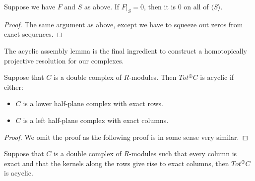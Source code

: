 \documentclass[../thesis.tex]{subfiles}
\begin{document}
            \begin{lemma}
                Suppose we have $F$ and $S$ as above. If $F|_S = 0$, then it is $0$ on all of $\langle S \rangle$.
            \end{lemma}

            \begin{proof}
                The same argument as above, except we have to squeeze out zeros from exact sequences.
            \end{proof}

            The acyclic assembly lemma is the final ingredient to construct a homotopically projective resolution for our complexes.

            \begin{lemma}
                Suppose that $C$ is a double complex of $R$-modules. Then $Tot^\oplus C$ is acyclic if either:
                \begin{itemize}
                    \item $C$ is a lower half-plane complex with exact rows.
                    \item $C$ is a left half-plane complex with exact columns.
                \end{itemize}
            \end{lemma}

            \begin{proof}
                We omit the proof as the following proof is in some sense very similar.
            \end{proof}

            \begin{corollary}\label{cor: ac-as-2}
                Suppose that $C$ is a double complex of $R$-modules such that every column is exact and that the kernels along the rows give rise to exact columns, then $Tot^\oplus C$ is acyclic.
            \end{corollary}
\end{document}
